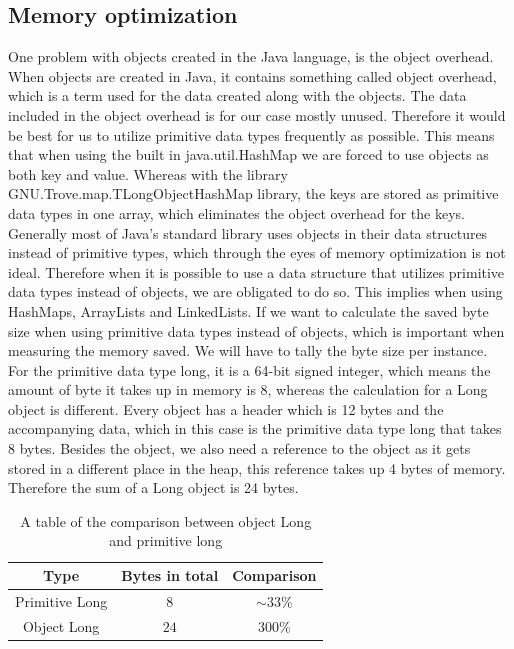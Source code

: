 \subsection{Memory optimization}
One problem with objects created in the Java language, is the object overhead. When objects are created in Java, it contains something called object overhead, which is a term used for the data created along with the objects. The data included in the object overhead is for our case mostly unused. Therefore it would be best for us to utilize primitive data types frequently as possible. This means that when using the built in java.util.HashMap we are forced to use objects as both key and value. Whereas with the library GNU.Trove.map.TLongObjectHashMap library, the keys are stored as primitive data types in one array, which eliminates the object overhead for the keys.
\newline
Generally most of Java’s standard library uses objects in their data structures instead of primitive types, which through the eyes of memory optimization is not ideal. Therefore when it is possible to use a data structure that utilizes primitive data types instead of objects, we are obligated to do so. This implies when using HashMaps, ArrayLists and LinkedLists.
\newline
If we want to calculate the saved byte size when using primitive data types instead of objects, which is important when measuring the memory saved. We will have to tally the byte size per instance. For the primitive data type long, it is a 64-bit signed integer, which means the amount of byte it takes up in memory is 8, whereas the calculation for a Long object is different. Every object has a header which is 12 bytes and the accompanying data, which in this case is the primitive data type long that takes 8 bytes. Besides the object, we also need a reference to the object as it gets stored in a different place in the heap, this reference takes up 4 bytes of memory. Therefore the sum of a Long object is 24 bytes.\cite{memory/objects}
\begin{table}[ht]
  \centering
  \begin{tabular}{ c|c|c }
   \textbf{Type} & \textbf{Bytes in total} & \textbf{Comparison}\\
   \hline
   Primitive Long & $8$ & $\sim33\%$ \\
   Object Long & $24$ & $300\%$ \\
  \end{tabular}\\
  \caption{\centering A table of the comparison between object Long and primitive long}
\end{table}
